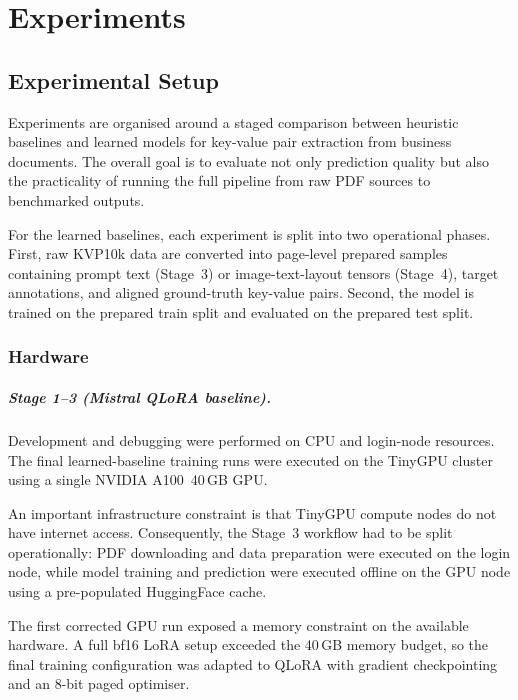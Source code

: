 \chapter{Experiments}
\label{ch:experiments}

\section{Experimental Setup}
\label{sec:experimental-setup}

Experiments are organised around a staged comparison between heuristic
baselines and learned models for key-value pair extraction from business
documents. The overall goal is to evaluate not only prediction quality but
also the practicality of running the full pipeline from raw PDF sources to
benchmarked outputs.

For the learned baselines, each experiment is split into two operational
phases. First, raw KVP10k data are converted into page-level prepared samples
containing prompt text (Stage~3) or image-text-layout tensors (Stage~4),
target annotations, and aligned ground-truth key-value pairs. Second, the
model is trained on the prepared train split and evaluated on the prepared
test split.

\subsection{Hardware}
\label{sec:hardware}

\paragraph{Stage 1--3 (Mistral QLoRA baseline).}
Development and debugging were performed on CPU and login-node resources. The
final learned-baseline training runs were executed on the TinyGPU cluster
using a single NVIDIA A100~40\,GB GPU.

An important infrastructure constraint is that TinyGPU compute nodes do not
have internet access. Consequently, the Stage~3 workflow had to be split
operationally: PDF downloading and data preparation were executed on the login
node, while model training and prediction were executed offline on the GPU
node using a pre-populated HuggingFace cache.

The first corrected GPU run exposed a memory constraint on the available
hardware. A full bf16 LoRA setup exceeded the 40\,GB memory budget, so the
final training configuration was adapted to QLoRA with gradient checkpointing
and an 8-bit paged optimiser.

